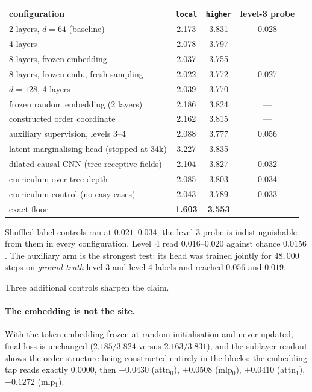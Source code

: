 \begin{center}
\begin{tabular}{lccc}
\toprule
configuration & \texttt{local} & \texttt{higher} & level-3 probe \\
\midrule
2 layers, $d=64$ (baseline)      & 2.173 & 3.831 & 0.028 \\
4 layers                         & 2.078 & 3.797 & --- \\
8 layers, frozen embedding       & 2.037 & 3.755 & --- \\
8 layers, frozen emb., fresh sampling & 2.022 & 3.772 & 0.027 \\
$d=128$, 4 layers                & 2.039 & 3.770 & --- \\
frozen random embedding (2 layers) & 2.186 & 3.824 & --- \\
constructed order coordinate     & 2.162 & 3.815 & --- \\
auxiliary supervision, levels 3--4 & 2.088 & 3.777 & 0.056 \\
latent marginalising head (stopped at 34k) & 3.227 & 3.835 & --- \\
dilated causal CNN (tree receptive fields) & 2.104 & 3.827 & 0.032 \\
curriculum over tree depth       & 2.085 & 3.803 & 0.034 \\
curriculum control (no easy cases) & 2.043 & 3.789 & 0.033 \\
\midrule
exact floor                      & \textbf{1.603} & \textbf{3.553} & --- \\
\bottomrule
\end{tabular}
\end{center}

\noindent
Shuffled-label controls ran at $0.021$--$0.034$; the level-3 probe is
indistinguishable from them in every configuration. Level~4 read $0.016$--$0.020$
against chance $0.0156$. The auxiliary arm is the strongest test: its head was
trained jointly for $48{,}000$ steps on \emph{ground-truth} level-3 and level-4
labels and reached $0.056$ and $0.019$.

Three additional controls sharpen the claim.

\paragraph{The embedding is not the site.}
With the token embedding frozen at random initialisation and never updated,
final loss is unchanged ($2.185/3.824$ versus $2.163/3.831$), and the
sublayer readout shows the order structure being constructed entirely in the
blocks: the embedding tap reads exactly $0.0000$, then $+0.0430$ (attn$_0$),
$+0.0508$ (mlp$_0$), $+0.0410$ (attn$_1$), $+0.1272$ (mlp$_1$).

